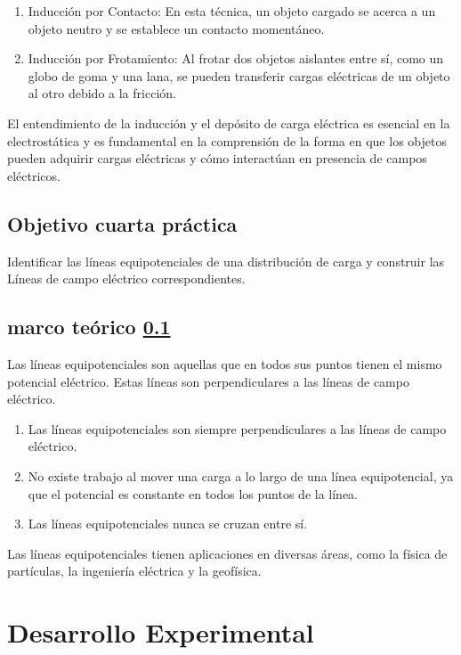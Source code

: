 \documentclass{article}
\begin{document}
\begin{multicols}{2}
\begin{enumerate}
\item Inducción por Contacto: En esta técnica, un objeto cargado se acerca a un objeto neutro y se establece un contacto momentáneo.

\item Inducción por Frotamiento: Al frotar dos objetos aislantes entre sí, como un globo de goma y una lana, se pueden transferir cargas eléctricas de un objeto al otro debido a la fricción.

\end{enumerate}

El entendimiento de la inducción y el depósito de carga eléctrica es esencial
en la electrostática y es fundamental en la comprensión de la forma en que los
objetos pueden adquirir cargas eléctricas y cómo interactúan en presencia de campos eléctricos.

\subsection{Objetivo cuarta práctica}\label{Objetivo cuarta práctica}	
Identificar las líneas equipotenciales de una distribución de carga y construir las
 Líneas de campo eléctrico correspondientes.

\subsection{marco teórico \ref{Objetivo cuarta práctica}}
Las líneas equipotenciales son aquellas que en todos sus puntos tienen el mismo potencial eléctrico. Estas líneas son perpendiculares a las líneas de campo eléctrico.

\begin{enumerate}
    \item Las líneas equipotenciales son siempre perpendiculares a las líneas de campo eléctrico.
    \item No existe trabajo al mover una carga a lo largo de una línea equipotencial, ya que el potencial es constante en todos los puntos de la línea.
    \item Las líneas equipotenciales nunca se cruzan entre sí.
\end{enumerate}

Las líneas equipotenciales tienen aplicaciones en diversas áreas, como la física de partículas, la ingeniería eléctrica y la geofísica.
\section{Desarrollo Experimental}\label{Desarrollo experimental}				%

\end{multicols}
\end{document}
